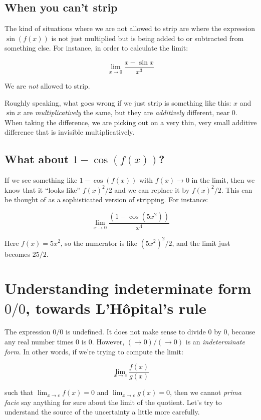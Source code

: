 \documentclass{amsart}
\begin{document}
\subsection{When you can't strip}

The kind of situations where we are not allowed to strip are where the
expression $\sin(f(x))$ is not just multiplied but is being added to
or subtracted from something else. For instance, in order to calculate
the limit:

$$\lim_{x \to 0} \frac{x - \sin x}{x^3}$$

We are {\em not} allowed to strip.

Roughly speaking, what goes wrong if we just strip is something like
this: $x$ and $\sin x$ are {\em multiplicatively} the same, but they
are {\em additively} different, near $0$. When taking the difference,
we are picking out on a very thin, very small additive difference that
is invisible multiplicatively.

\subsection*{What about $1 - \cos(f(x))$?}

If we see something like $1 - \cos(f(x))$ with $f(x) \to 0$ in the
limit, then we know that it ``looks like'' $f(x)^2/2$ and we can
replace it by $f(x)^2/2$. This can be thought of as a sophisticated
version of stripping. For instance:

$$\lim_{x \to 0} \frac{(1 - \cos(5x^2))}{x^4}$$

Here $f(x) = 5x^2$, so the numerator is like $(5x^2)^2/2$, and the
limit just becomes $25/2$.

\section{Understanding indeterminate form $0/0$, towards L'H\^{o}pital's rule}

The expression $0/0$ is undefined. It does not make sense to divide
$0$ by $0$, because any real number times $0$ is $0$. However, $(\to
0)/(\to 0)$ is an {\em indeterminate form}. In other words, if we're
trying to compute the limit:

$$\lim_{x \to c} \frac{f(x)}{g(x)}$$

such that $\lim_{x \to c} f(x) = 0$ and $\lim_{x \to c} g(x) = 0$,
then we cannot {\em prima facie} say anything for sure about the limit
of the quotient. Let's try to understand the source of the uncertainty
a little more carefully.
\end{document}
